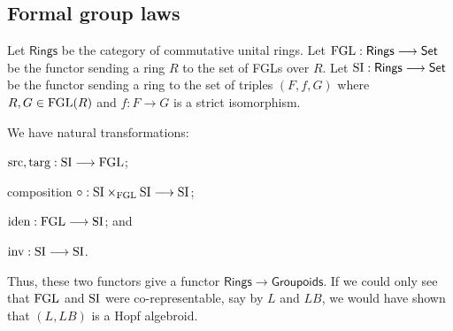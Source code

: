 \documentclass[11pt]{article}
\begin{document}
\begin{Formal Group Laws}
\section*{Formal group laws}
\newcommand{\FGL}{\textup{FGL}}
\newcommand{\FGLp}{\textup{FGL}^{(p)}}
\newcommand{\SI}{\textup{SI}}
\newcommand{\Ring}{\textsf{Rings}}
Let $\Ring$ be the category of commutative unital rings. Let $\FGL:\Ring\to\Set$ be the functor sending a ring $R$ to the set of FGLs over $R$. Let $\SI:\Ring\to\Set$ be the functor sending a ring to the set of triples $(F,f,G)$ where $R,G\in\FGL(R)$ and $f:F\to G$ is a strict isomorphism.

We have natural transformations:
\begin{itemise}
\item $\textup{src},\textup{targ}:\SI\to\FGL$;
\item composition $\circ:\SI\times_\FGL\SI\to \SI$;
\item $\textup{iden}:\FGL\to\SI$; and
\item $\textup{inv}:\SI\to\SI$.
\end{itemise}
Thus, these two functors give a functor $\Ring\to\mathsf{Groupoids}$. If we could only see that $\FGL$ and $\SI$ were co-representable, say by $L$ and $LB$, we would have shown that $(L,LB)$ is a Hopf algebroid.


\end{Formal Group Laws}
\end{document}
